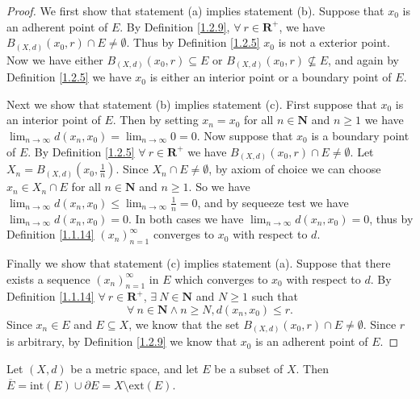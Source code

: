 \begin{proof}
    We first show that statement (a) implies statement (b).
    Suppose that \(x_0\) is an adherent point of \(E\).
    By Definition \ref{1.2.9}, \(\forall\ r \in \mathbf{R}^+\), we have \(B_{(X, d)}(x_0, r) \cap E \neq \emptyset\).
    Thus by Definition \ref{1.2.5} \(x_0\) is not a exterior point.
    Now we have either \(B_{(X, d)}(x_0, r) \subseteq E\) or \(B_{(X, d)}(x_0, r) \not\subseteq E\), and again by Definition \ref{1.2.5} we have \(x_0\) is either an interior point or a boundary point of \(E\).

    Next we show that statement (b) implies statement (c).
    First suppose that \(x_0\) is an interior point of \(E\).
    Then by setting \(x_n = x_0\) for all \(n \in \mathbf{N}\) and \(n \geq 1\) we have \(\lim_{n \to \infty} d(x_n, x_0) = \lim_{n \to \infty} 0 = 0\).
    Now suppose that \(x_0\) is a boundary point of \(E\).
    By Definition \ref{1.2.5} \(\forall\ r \in \mathbf{R}^+\) we have \(B_{(X, d)}(x_0, r) \cap E \neq \emptyset\).
    Let \(X_n = B_{(X, d)}(x_0, \frac{1}{n})\).
    Since \(X_n \cap E \neq \emptyset\), by axiom of choice we can choose \(x_n \in X_n \cap E\) for all \(n \in \mathbf{N}\) and \(n \geq 1\).
    So we have \(\lim_{n \to \infty} d(x_n, x_0) \leq \lim_{n \to \infty} \frac{1}{n} = 0\), and by sequeeze test we have \(\lim_{n \to \infty} d(x_n, x_0) = 0\).
    In both cases we have \(\lim_{n \to \infty} d(x_n, x_0) = 0\), thus by Definition \ref{1.1.14} \((x_n)_{n = 1}^\infty\) converges to \(x_0\) with respect to \(d\).

    Finally we show that statement (c) implies statement (a).
    Suppose that there exists a sequence \((x_n)_{n = 1}^\infty\) in \(E\) which converges to \(x_0\) with respect to \(d\).
    By Definition \ref{1.1.14} \(\forall\ r \in \mathbf{R}^+\), \(\exists\ N \in \mathbf{N}\) and \(N \geq 1\) such that
    \[
        \forall\ n \in \mathbf{N} \land n \geq N, d(x_n, x_0) \leq r.
    \]
    Since \(x_n \in E\) and \(E \subseteq X\), we know that the set \(B_{(X, d)}(x_0, r) \cap E \neq \emptyset\).
    Since \(r\) is arbitrary, by Definition \ref{1.2.9} we know that \(x_0\) is an adherent point of \(E\).
\end{proof}

\begin{corollary}\label{1.2.11}
    Let \((X, d)\) be a metric space, and let \(E\) be a subset of \(X\).
    Then \(\overline{E} = \text{int}(E) \cup \partial E = X \setminus \text{ext}(E)\).
\end{corollary}

